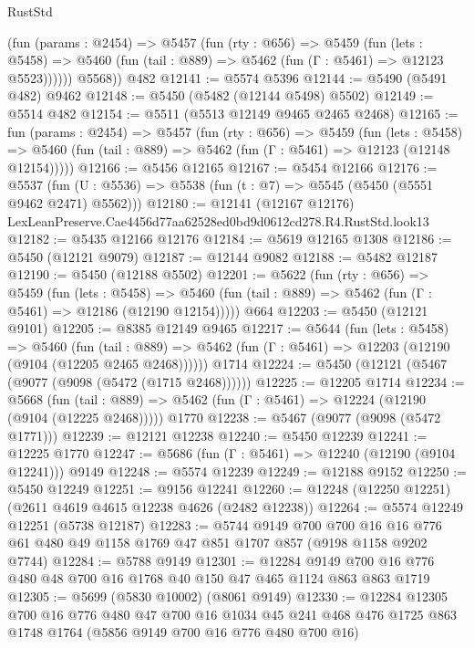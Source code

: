 \begin{lexlean}{RustStd}
\begin{coremodule}
          (fun (params : @2454) =>
          @5457
            (fun (rty : @656) =>
            @5459
              (fun (lets : @5458) =>
              @5460 (fun (tail : @889) => @5462 (fun (Γ : @5461) => @12123 @5523))))))
        @5568))
    @482
@12141 := @5574 @5396
@12144 := @5490 (@5491 @482) @9462
@12148 := @5450 (@5482 (@12144 @5498) @5502)
@12149 := @5514 @482
@12154 := @5511 (@5513 @12149 @9465 @2465 @2468)
@12165 := fun (params : @2454) =>
  @5457
    (fun (rty : @656) =>
    @5459
      (fun (lets : @5458) =>
      @5460 (fun (tail : @889) => @5462 (fun (Γ : @5461) => @12123 (@12148 @12154)))))
@12166 := @5456 @12165
@12167 := @5454 @12166
@12176 := @5537 (fun (U : @5536) => @5538 (fun (t : @7) => @5545 (@5450 (@5551 @9462 @2471) @5562)))
@12180 := @12141 (@12167 @12176) LexLeanPreserve.Cae4456d77aa62528ed0bd9d0612cd278.R4.RustStd.look13
@12182 := @5435 @12166 @12176
@12184 := @5619 @12165 @1308
@12186 := @5450 (@12121 @9079)
@12187 := @12144 @9082
@12188 := @5482 @12187
@12190 := @5450 (@12188 @5502)
@12201 := @5622
    (fun (rty : @656) =>
    @5459
      (fun (lets : @5458) =>
      @5460 (fun (tail : @889) => @5462 (fun (Γ : @5461) => @12186 (@12190 @12154)))))
    @664
@12203 := @5450 (@12121 @9101)
@12205 := @8385 @12149 @9465
@12217 := @5644
    (fun (lets : @5458) =>
    @5460
      (fun (tail : @889) =>
      @5462 (fun (Γ : @5461) => @12203 (@12190 (@9104 (@12205 @2465 @2468))))))
    @1714
@12224 := @5450 (@12121 (@5467 (@9077 (@9098 (@5472 (@1715 @2468))))))
@12225 := @12205 @1714
@12234 := @5668
    (fun (tail : @889) => @5462 (fun (Γ : @5461) => @12224 (@12190 (@9104 (@12225 @2468)))))
    @1770
@12238 := @5467 (@9077 (@9098 (@5472 @1771)))
@12239 := @12121 @12238
@12240 := @5450 @12239
@12241 := @12225 @1770
@12247 := @5686 (fun (Γ : @5461) => @12240 (@12190 (@9104 @12241))) @9149
@12248 := @5574 @12239
@12249 := @12188 @9152
@12250 := @5450 @12249
@12251 := @9156 @12241
@12260 := @12248 (@12250 @12251) (@2611 @4619 @4615 @12238 @4626 (@2482 @12238))
@12264 := @5574 @12249 @12251 (@5738 @12187)
@12283 := @5744
    @9149
    @700
    @700
    @16
    @16
    @776
    @61
    @480
    @49
    @1158
    @1769
    @47
    @851
    @1707
    @857
    (@9198 @1158 @9202 @7744)
@12284 := @5788 @9149
@12301 := @12284 @9149 @700 @16 @776 @480 @48 @700 @16 @1768 @40 @150 @47 @465 @1124 @863 @863 @1719
@12305 := @5699 (@5830 @10002) (@8061 @9149)
@12330 := @12284
    @12305
    @700
    @16
    @776
    @480
    @47
    @700
    @16
    @1034
    @45
    @241
    @468
    @476
    @1725
    @863
    @1748
    @1764
    (@5856 @9149 @700 @16 @776 @480 @700 @16)

\end{coremodule}
\end{lexlean}
